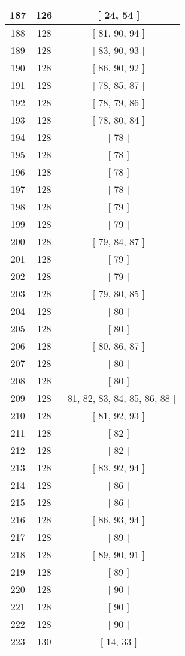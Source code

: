 \begin{center}
\begin{longtable}[H]{|| c c c ||}
187 & 126 & [ 24, 54 ]
\\\hline
188 & 128 & [ 81, 90, 94 ]
\\\hline
189 & 128 & [ 83, 90, 93 ]
\\\hline
190 & 128 & [ 86, 90, 92 ]
\\\hline
191 & 128 & [ 78, 85, 87 ]
\\\hline
192 & 128 & [ 78, 79, 86 ]
\\\hline
193 & 128 & [ 78, 80, 84 ]
\\\hline
194 & 128 & [ 78 ]
\\\hline
195 & 128 & [ 78 ]
\\\hline
196 & 128 & [ 78 ]
\\\hline
197 & 128 & [ 78 ]
\\\hline
198 & 128 & [ 79 ]
\\\hline
199 & 128 & [ 79 ]
\\\hline
200 & 128 & [ 79, 84, 87 ]
\\\hline
201 & 128 & [ 79 ]
\\\hline
202 & 128 & [ 79 ]
\\\hline
203 & 128 & [ 79, 80, 85 ]
\\\hline
204 & 128 & [ 80 ]
\\\hline
205 & 128 & [ 80 ]
\\\hline
206 & 128 & [ 80, 86, 87 ]
\\\hline
207 & 128 & [ 80 ]
\\\hline
208 & 128 & [ 80 ]
\\\hline
209 & 128 & [ 81, 82, 83, 84, 85, 86, 88 ]
\\\hline
210 & 128 & [ 81, 92, 93 ]
\\\hline
211 & 128 & [ 82 ]
\\\hline
212 & 128 & [ 82 ]
\\\hline
213 & 128 & [ 83, 92, 94 ]
\\\hline
214 & 128 & [ 86 ]
\\\hline
215 & 128 & [ 86 ]
\\\hline
216 & 128 & [ 86, 93, 94 ]
\\\hline
217 & 128 & [ 89 ]
\\\hline
218 & 128 & [ 89, 90, 91 ]
\\\hline
219 & 128 & [ 89 ]
\\\hline
220 & 128 & [ 90 ]
\\\hline
221 & 128 & [ 90 ]
\\\hline
222 & 128 & [ 90 ]
\\\hline
223 & 130 & [ 14, 33 ]

\end{longtable}
\end{center}
